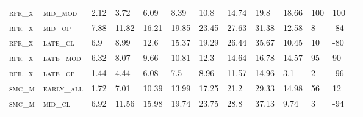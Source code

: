 \begin{landscape}
\begin{table}[!htbp]
\begin{tabular}{@{}lllllllllllll@{}}
\footnotesize \textsc{rfr\_x}      & \footnotesize \textsc{mid\_mod  }               & \footnotesize 2.12           & \footnotesize  3.72           & \footnotesize 6.09             & \footnotesize 8.39             & \footnotesize 10.8             & \footnotesize 14.74            & \footnotesize 19.8        & \footnotesize 18.66    & \footnotesize 100     & \footnotesize 100    \\
\footnotesize \textsc{rfr\_x}      & \footnotesize \textsc{mid\_op   }               & \footnotesize 7.88           & \footnotesize  11.82          & \footnotesize 16.21            & \footnotesize 19.85            & \footnotesize 23.45            & \footnotesize 27.63            & \footnotesize 31.38       & \footnotesize 12.58    & \footnotesize 8       & \footnotesize -84    \\
\footnotesize \textsc{rfr\_x}      & \footnotesize \textsc{late\_cl  }               & \footnotesize 6.9            & \footnotesize  8.99           & \footnotesize 12.6             & \footnotesize 15.37            & \footnotesize 19.29            & \footnotesize 26.44            & \footnotesize 35.67       & \footnotesize 10.45    & \footnotesize 10      & \footnotesize -80    \\
\footnotesize \textsc{rfr\_x}      & \footnotesize \textsc{late\_mod }               & \footnotesize 6.32           & \footnotesize  8.07           & \footnotesize 9.66             & \footnotesize 10.81            & \footnotesize 12.3             & \footnotesize 14.64            & \footnotesize 16.78       & \footnotesize 14.57    & \footnotesize 95      & \footnotesize 90    \\
\footnotesize \textsc{rfr\_x}      & \footnotesize \textsc{late\_op  }               & \footnotesize 1.44           & \footnotesize  4.44           & \footnotesize 6.08             & \footnotesize 7.5              & \footnotesize 8.96             & \footnotesize 11.57            & \footnotesize 14.96       & \footnotesize 3.1      & \footnotesize 2       & \footnotesize -96    \\
\footnotesize \textsc{smc\_m}      & \footnotesize \textsc{early\_all}               & \footnotesize 1.72           & \footnotesize  7.01           & \footnotesize 10.39            & \footnotesize 13.99            & \footnotesize 17.25            & \footnotesize 21.2             & \footnotesize 29.33       & \footnotesize 14.98    & \footnotesize 56      & \footnotesize 12    \\
\footnotesize \textsc{smc\_m}      & \footnotesize \textsc{mid\_cl   }               & \footnotesize 6.92           & \footnotesize  11.56          & \footnotesize 15.98            & \footnotesize 19.74            & \footnotesize 23.75            & \footnotesize 28.8             & \footnotesize 37.13       & \footnotesize 9.74     & \footnotesize 3       & \footnotesize -94    \\

\end{tabular}
\end{table}
\end{landscape}
